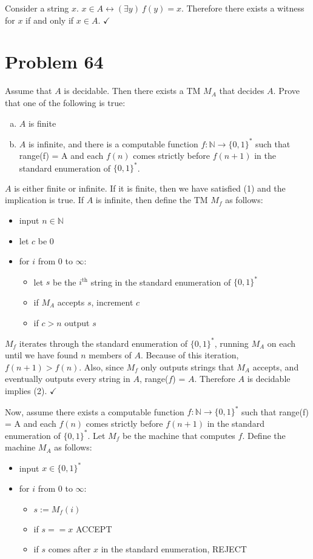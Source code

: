 \documentclass[11pt]{article}
\let\iff\leftrightarrow
\let\imp\rightarrow
\begin{document}
Consider a string $x$.
$x \in A \iff (\exists y)\ f(y) =x$.
Therefore there exists a witness for $x$ if and only if $x \in A$. $\checkmark$


\section*{Problem 64}

Assume that $A$ is decidable. 
Then there exists a TM $M_A$ that decides $A$.
Prove that one of the following is true:
\begin{enumerate}[(a)]
	\item $A$ is finite
	\item $A$ is infinite, and there is a computable function $f: \mathbb{N} \imp \{0,1\}^*$ such that range(f) = A and each $f(n)$ comes strictly before $f(n+1)$ in the standard enumeration of $\{0,1\}^*$.
\end{enumerate}

$A$ is either finite or infinite.
If it is finite, then we have satisfied (1) and the implication is true.
If $A$ is infinite, then define the TM $M_f$ as follows:
\begin{itemize}
	\item input $n \in \mathbb{N}$
	\item let $c$ be 0
	\item for $i$ from 0 to $\infty$:
	\begin{itemize}
		\item let $s$ be the $i^{\text{th}}$ string in the standard enumeration of $\{0,1\}^*$
		\item if $M_A$ accepts $s$, increment $c$
		\item if $c > n$ output $s$
	\end{itemize}
\end{itemize}

$M_f$ iterates through the standard enumeration of $\{0,1\}^*$, running $M_A$ on each until we have found $n$ members of $A$.
Because of this iteration, $f( n+ 1) > f(n)$.
Also, since $M_f$ only outputs strings that $M_A$ accepts, and eventually outputs every string in $A$, range($f$) = $A$.
Therefore $A$ is decidable implies (2). $\checkmark$

Now, assume there exists a computable function $f: \mathbb{N} \imp \{0,1\}^*$ such that range(f) = A and each $f(n)$ comes strictly before $f(n+1)$ in the standard enumeration of $\{0,1\}^*$.
Let $M_f$ be the machine that computes $f$.
Define the machine $M_A$ as follows:
\begin{itemize}
	\item input $x \in \{0,1\}^*$
	\item for $i$ from 0 to $\infty$:
	\begin{itemize}
		\item $s := M_f(i)$
		\item if $s == x$ ACCEPT
		\item if $s$ comes after $x$ in the standard enumeration, REJECT
	\end{itemize}
\end{itemize}
\end{document}
